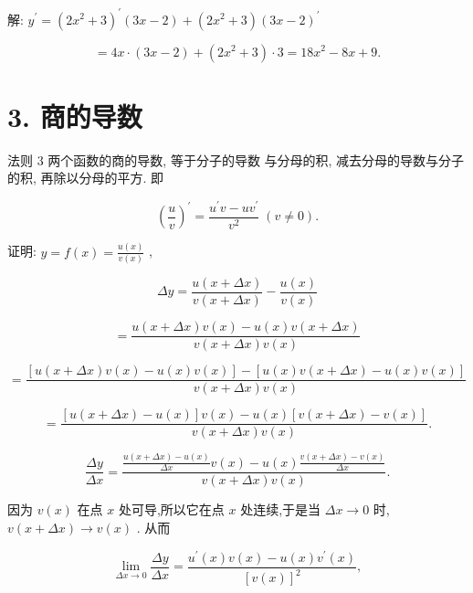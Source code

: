 \documentclass[10pt]{article}
\begin{document}
解: \({y}^{\prime } = {\left( 2{x}^{2} + 3\right) }^{\prime }\left( {{3x} - 2}\right) + \left( {2{x}^{2} + 3}\right) {\left( 3x - 2\right) }^{\prime }\)

\[
= {4x} \cdot \left( {{3x} - 2}\right) + \left( {2{x}^{2} + 3}\right) \cdot 3 = {18}{x}^{2} - {8x} + 9\text{.}
\]

\section*{3. 商的导数}

法则 3 两个函数的商的导数, 等于分子的导数 与分母的积, 减去分母的导数与分子的积, 再除以分母的平方. 即

\[
{\left( \frac{u}{v}\right) }^{\prime } = \frac{{u}^{\prime }v - u{v}^{\prime }}{{v}^{2}}\;\left( {v \neq 0}\right) .
\]

证明: \(y = f\left( x\right) = \frac{u\left( x\right) }{v\left( x\right) }\) ,

\[
{\Delta y} = \frac{u\left( {x + {\Delta x}}\right) }{v\left( {x + {\Delta x}}\right) } - \frac{u\left( x\right) }{v\left( x\right) }
\]

\[
= \frac{u\left( {x + {\Delta x}}\right) v\left( x\right) - u\left( x\right) v\left( {x + {\Delta x}}\right) }{v\left( {x + {\Delta x}}\right) v\left( x\right) }
\]

\[
= \frac{\left\lbrack {u\left( {x + {\Delta x}}\right) v\left( x\right) - u\left( x\right) v\left( x\right) }\right\rbrack - \left\lbrack {u\left( x\right) v\left( {x + {\Delta x}}\right) - u\left( x\right) v\left( x\right) }\right\rbrack }{v\left( {x + {\Delta x}}\right) v\left( x\right) }
\]

\[
= \frac{\left\lbrack {u\left( {x + {\Delta x}}\right) - u\left( x\right) }\right\rbrack v\left( x\right) - u\left( x\right) \left\lbrack {v\left( {x + {\Delta x}}\right) - v\left( x\right) }\right\rbrack }{v\left( {x + {\Delta x}}\right) v\left( x\right) }.
\]

\[
\frac{\Delta y}{\Delta x} = \frac{\frac{u\left( {x + {\Delta x}}\right) - u\left( x\right) }{\Delta x}v\left( x\right) - u\left( x\right) \frac{v\left( {x + {\Delta x}}\right) - v\left( x\right) }{\Delta x}}{v\left( {x + {\Delta x}}\right) v\left( x\right) }.
\]

因为 \(v\left( x\right)\) 在点 \(x\) 处可导,所以它在点 \(x\) 处连续,于是当 \({\Delta x} \rightarrow 0\) 时, \(v\left( {x + {\Delta x}}\right) \rightarrow v\left( x\right)\) . 从而

\[
\mathop{\lim }\limits_{{{\Delta x} \rightarrow 0}}\frac{\Delta y}{\Delta x} = \frac{{u}^{\prime }\left( x\right) v\left( x\right) - u\left( x\right) {v}^{\prime }\left( x\right) }{{\left\lbrack v\left( x\right) \right\rbrack }^{2}},
\]
\end{document}
